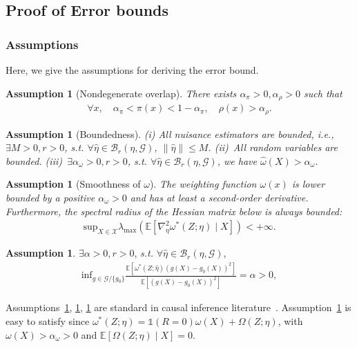 \documentclass{article}
\theoremstyle{plain}
\theoremstyle{definition}
\newtheorem{assumption}[theorem]{Assumption}
\theoremstyle{remark}
\newcommand{\E}{\mathbb{E}}                %
\newcommand{\1}{\mathds{1}}                %
\begin{document}
\subsection{Proof of Error bounds}
\label{app:proof-error-bound}

\subsubsection{Assumptions}
\label{app:error-bound-assumptions}
Here, we give the assumptions for deriving the error bound.
\begin{assumption}[Nondegenerate overlap]
\label{nondegen-overlap}
\emph{There exists $\alpha_\pi>0, \alpha_\rho>0$ such that}
    \begin{align}
        \forall x, \quad\alpha_\pi<\pi(x) <1-\alpha_\pi, \quad \rho(x)>\alpha_\rho.
    \end{align}
\end{assumption}
\begin{assumption}[Boundedness]
\label{boundedness}
\emph{(i) All nuisance estimators are bounded, i.e., $\exists M >0, r>0$, s.t. $\forall \hat\eta \in \mathcal{B}_r(\eta,\mathcal{G})$, $\|\hat\eta\| \leq M$. (ii)~All random variables are bounded. 
(iii)~$\exists \alpha_\omega >0, r>0$, s.t. $\forall \hat\eta \in \mathcal{B}_r(\eta,\mathcal{G})$, we have $\hat\omega(X)>\alpha_\omega$.}
\end{assumption}
\begin{assumption}[Smoothness of $\omega$]
\label{smoothness}
\emph{The weighting function $\omega(x)$ is lower bounded by a positive $\alpha_\omega>0$ and has at least a second-order derivative. Furthermore, the spectral radius of the Hessian matrix below is always bounded:}
\begin{align}
    \text{sup}_{X\in\mathcal{X}}\lambda_{\max}(\E\left[ \nabla^2_\eta \omega^*(Z;\eta) \mid X \right]) < +\infty.
\end{align}   
\end{assumption}
\begin{assumption}
\label{core-assumption}
$\exists\alpha >0, r>0$, \emph{s.t.} $\forall \hat\eta \in \mathcal{B}_r(\eta,\mathcal{G})$, 
\footnotesize
\begin{align}
    \text{inf}_{g \in \mathcal{G}/\{g_0\}} \frac{\E\left[\omega^*(Z;\hat\eta) (g(X) - g_0(X))^2\right]}{\E\left[(g(X) - g_0(X))^2\right]} = \alpha > 0,
\end{align}
\vspace{-0.3cm}
\normalsize
\end{assumption}
Assumptions~\ref{nondegen-overlap}, \ref{boundedness}, \ref{smoothness} are standard in causal inference literature~\cite{Foster.2023, Kennedy.2023}. Assumption~\ref{core-assumption} is easy to satisfy since $\omega^*(Z;\eta) = \1(R=0) \omega(X) + \Omega(Z;\eta)$, with $\omega(X) > \alpha_\omega>0$ and $\E\left[\Omega(Z;\eta) \mid X\right] = 0$.
\end{document}
